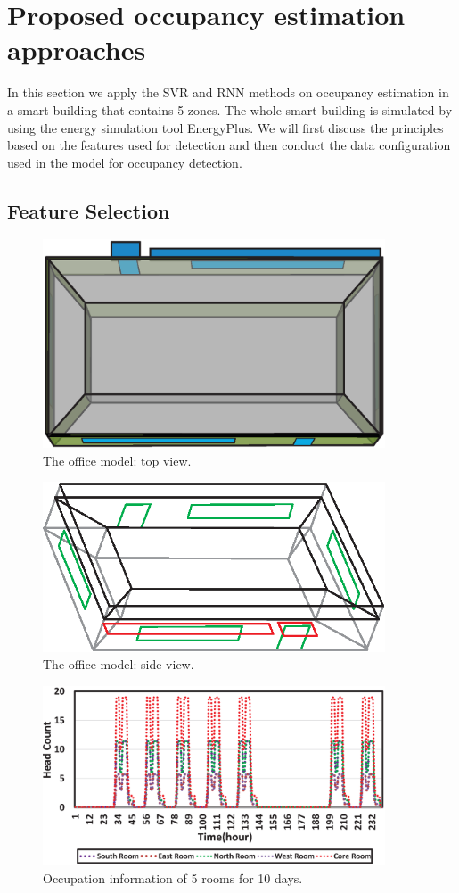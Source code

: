 \section{Proposed occupancy estimation approaches}
\label{sec:proposed_methods}
In this section we apply the SVR and RNN methods on occupancy estimation in a smart building that contains 5 zones. The whole smart building is simulated by using the energy simulation tool EnergyPlus. We will first discuss the principles based on the features used for detection and then conduct the data configuration used in the model for occupancy detection.
\subsection{Feature Selection}
\label{sec:feature_selection}
\begin{figure}[h]
\centering
\includegraphics[width=4in]{./Pics/TopView2.eps}
\caption{The office model: top view.}
\label{fig:office1}
\end{figure}

\begin{figure}[h]
\centering
\includegraphics[width=4in]{./Pics/SideView.eps}
\caption{The office model: side view.}
\label{fig:office2}
\end{figure}

\begin{figure}[h]
\centering
\includegraphics[width=4in]{./Pics/Headcount.eps}
\caption{Occupation information of 5 rooms for 10 days.}
\label{fig:Headcount}
\end{figure}

